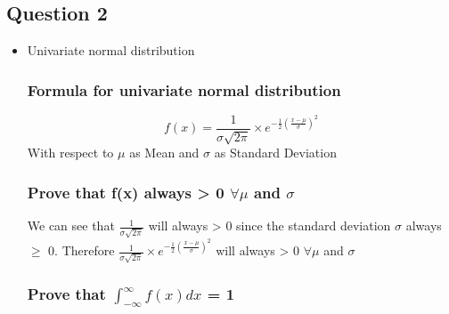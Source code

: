 \documentclass{article}
\begin{document}
    \subsection{Question 2}
        \begin{itemize}
            \item Univariate normal distribution
            \subsubsection{Formula for univariate normal distribution}
                    \[
                        f(x) = \frac{1}{\sigma\sqrt{2\pi}}\times e^{ -\frac{1}{2}(\frac{x - \mu}{\sigma})^2} 
                    \]
            With respect to $\mu$ as Mean and $\sigma$ as Standard Deviation
            
            \subsubsection {Prove that f(x) always > 0 $\forall \mu $ and $ \sigma $}
            We can see that $\frac{1}{\sigma\sqrt{2\pi}}$ will always > 0 since the standard deviation $\sigma$ always $\ge$ 0. Therefore $ \frac{1}{\sigma\sqrt{2\pi}}\times e^{ -\frac{1}{2}(\frac{x - \mu}{\sigma})^2} $ will always > 0 $\forall \mu$ and $\sigma$
            \subsubsection{Prove that $\int_{-\infty}^{\infty} f(x)dx$ = 1}
            

\end{itemize}
\end{document}
